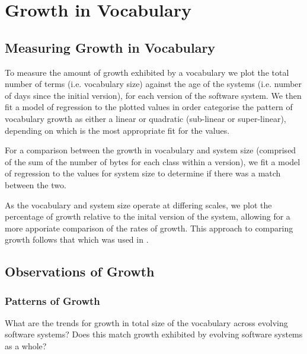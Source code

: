 
\section{Growth in Vocabulary} %
\label{sec:growth_in_vocabulary}

\subsection{Measuring Growth in Vocabulary} %
\label{sub:measuring_growth_in_vocabulary}

To measure the amount of growth exhibited by a vocabulary we plot the total number of terms (i.e. vocabulary size) against the age of the systems (i.e. number of days since the initial version), for each version of the software system. We then fit a model of regression to the plotted values in order categorise the pattern of vocabulary growth as either a linear or quadratic (sub-linear or super-linear), depending on which is the most appropriate fit for the values.

For a comparison between the growth in vocabulary and system size (comprised of the sum of the number of bytes for each class within a version), we fit a model of regression to the values for system size to determine if there was a match between the two.

As the vocabulary and system size operate at differing scales, we plot the percentage of growth relative to the inital version of the system, allowing for a more apporiate comparison of the rates of growth. This approach to comparing growth follows that which was used in \cite{Paulson04a}.


\subsection{Observations of Growth} %
\label{sub:observations_of_growth}

\subsubsection{Patterns of Growth} %
\label{ssub:patterns_of_growth}

What are the trends for growth in total size of the vocabulary across evolving software systems? Does this match growth exhibited by evolving software systems as a whole?

